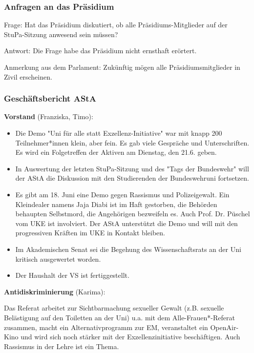 \documentclass[ngerman,headheight=70pt]{scrartcl}
\begin{document}
    \subsubsection{Anfragen an das Präsidium}

    Frage: Hat das Präsidium diskutiert, ob alle Präsidiums-Mitglieder auf der
    StuPa-Sitzung anwesend sein müssen?

    Antwort: Die Frage habe das Präsidium nicht ernsthaft erörtert.

    Anmerkung aus dem Parlament: Zukünftig mögen alle Präsidiumsmitglieder in
    Zivil erscheinen.

    \subsubsection{Geschäftsbericht AStA}

    \textbf{Vorstand} (Franziska, Timo):
    \begin{itemize}
        \item Die Demo "Uni für alle statt Exzellenz-Initiative" war mit knapp
        200 Teilnehmer*innen klein, aber fein. Es gab viele Gespräche und
        Unterschriften. Es wird ein Folgetreffen der Aktiven am Dienstag, den
        21.6. geben.
        \item In Auswertung der letzten StuPa-Sitzung und des "Tags der Bundeswehr"
        will der AStA die Diskussion mit den Studierenden der Bundeswehruni
        fortsetzen.
        \item Es gibt am 18. Juni eine Demo gegen Rassismus und Polizeigewalt.
        Ein Kleindealer namens Jaja Diabi ist im Haft gestorben, die Behörden
        behaupten Selbstmord, die Angehörigen bezweifeln es. Auch Prof. Dr.
        Püschel vom UKE ist involviert. Der AStA unterstützt die Demo und will
        mit den progressiven Kräften im UKE in Kontakt bleiben.
        \item Im Akademischen Senat sei die Begehung des Wissenschaftsrats an
        der Uni kritisch ausgewertet worden.
        \item Der Haushalt der VS ist fertiggestellt.
    \end{itemize}

    \textbf{Antidiskriminierung} (Karima):

    Das Referat arbeitet zur Sichtbarmachung sexueller Gewalt (z.B. sexuelle
    Belästigung auf den Toiletten an der Uni) u.a. mit dem Alle-Frauen*-Referat
    zusammen, macht ein Alternativprogramm zur EM, veranstaltet ein
    OpenAir-Kino und wird sich noch stärker mit der Exzellenzinitiative
    beschäftigen. Auch Rassismus in der Lehre ist ein Thema.
\end{document}
